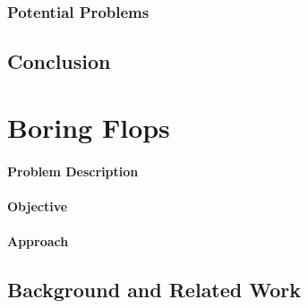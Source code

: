 \documentclass[a4paper]{article}
\begin{document}

\subsubsection{Potential Problems} %
\label{sec:SimpleAlways_potentialProblems}



\subsection{Conclusion} %
\label{sec:SimpleAlways_conclusion}



\section{Boring Flops} %
\label{sec:BoringFlops}

\paragraph{Problem Description} %
\label{sec:BoringFlops_problem}


\paragraph{Objective} %
\label{sec:BoringFlops_objective}


\paragraph{Approach} %
\label{sec:BoringFlops_approach}


\subsection{Background and Related Work} %
\label{sec:BoringFlops_background}
\end{document}
